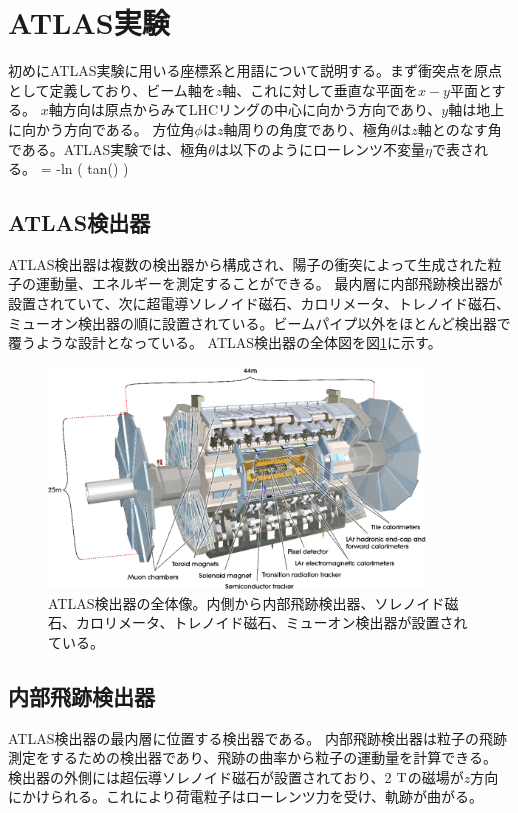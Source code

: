 \section{ATLAS実験}
初めにATLAS実験に用いる座標系と用語について説明する。まず衝突点を原点として定義しており、ビーム軸を$z$軸、これに対して垂直な平面を$x-y$平面とする。
$x$軸方向は原点からみてLHCリングの中心に向かう方向であり、$y$軸は地上に向かう方向である。
方位角$\phi$は$z$軸周りの角度であり、極角$\theta$は$z$軸とのなす角である。ATLAS実験では、極角$\theta$は以下のようにローレンツ不変量$\eta$で表される。
\bbb
\eta = -\rm{ln \left( tan\left(\right) \right) }
\eee


\subsection{ATLAS検出器}
ATLAS検出器は複数の検出器から構成され、陽子の衝突によって生成された粒子の運動量、エネルギーを測定することができる。
最内層に内部飛跡検出器が設置されていて、次に超電導ソレノイド磁石、カロリメータ、トレノイド磁石、ミューオン検出器の順に設置されている。ビームパイプ以外をほとんど検出器で覆うような設計となっている。
ATLAS検出器の全体図を図\ref{atlas_detector}に示す。

\begin{figure}[bpt]\centering
\includegraphics[width=10cm]{atlas_detector}
\caption[ATLAS検出器の全体像]{ATLAS検出器の全体像\cite{1-2}。内側から内部飛跡検出器、ソレノイド磁石、カロリメータ、トレノイド磁石、ミューオン検出器が設置されている。}
\label{atlas_detector}
\end{figure}


\subsection{内部飛跡検出器}
ATLAS検出器の最内層に位置する検出器である。
内部飛跡検出器は粒子の飛跡測定をするための検出器であり、飛跡の曲率から粒子の運動量を計算できる。
検出器の外側には超伝導ソレノイド磁石が設置されており、2 $\rm{T}$の磁場が$z$方向にかけられる。これにより荷電粒子はローレンツ力を受け、軌跡が曲がる。

